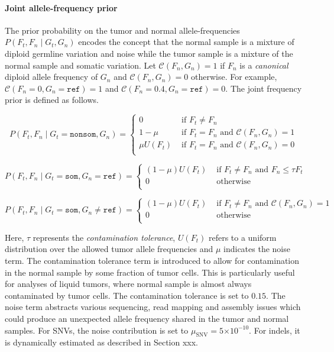 \documentclass{article}
\newcommand{\e}[1]{\ensuremath{\times 10^{#1}}}
\begin{document}
\paragraph{Joint allele-frequency prior}
The prior probability on the tumor and normal allele-frequencies $P(F_t, F_n \mid G_t, G_n)$ encodes the concept that the normal sample is a mixture of diploid germline variation and noise while the tumor sample is a mixture of the normal sample and somatic variation. Let $\mathcal{C} (F_n, G_n) = 1$ if $F_n$ is a {\em canonical} diploid allele frequency of $G_n$ and $\mathcal{C} (F_n, G_n) = 0$ otherwise. For example, $\mathcal{C} (F_n=0, G_n = \texttt{ref}) = 1$ and $\mathcal{C} (F_n=0.4, G_n = \texttt{ref}) = 0$. The joint frequency prior is defined as follows.

\begin{equation*}
P(F_t, F_n \mid G_t = \texttt{nonsom}, G_n)=
\begin{cases}
	0 & \text{ if } F_t \neq F_n \\
	1-\mu & \text{ if } F_t = F_n \text{ and }\mathcal{C}(F_n, G_n) = 1 \\
	\mu U(F_t) & \text{ if } F_t = F_n \text{ and }\mathcal{C}(F_n, G_n) = 0 \\
\end{cases}
\end{equation*}

\begin{equation*}
P(F_t, F_n \mid G_t = \texttt{som}, G_n = \texttt{ref})=
\begin{cases}
	(1-\mu)U(F_t) & \text{ if } F_t \neq F_n \text{ and } F_n \leq \tau F_t \\
	0 & \text{ otherwise } \\
\end{cases}
\end{equation*}

\begin{equation*}
P(F_t, F_n \mid G_t = \texttt{som}, G_n \neq \texttt{ref})=
\begin{cases}
	(1-\mu)U(F_t) & \text{ if } F_t \neq F_n \text{ and } \mathcal{C}(F_n, G_n) = 1 \\
	0 & \text{ otherwise } \\
\end{cases}
\end{equation*}

\noindent Here, $\tau$ represents the {\em contamination tolerance}, $U(F_t)$ refers to a uniform distribution over the allowed tumor allele frequencies and $\mu$ indicates the noise term. The contamination tolerance term is introduced to allow for contamination in the normal sample by some fraction of tumor cells. This is particularly useful for analyses of liquid tumors, where normal sample is almost always contaminated by tumor cells. The contamination tolerance is set to $0.15$. The noise term abstracts various sequencing, read mapping and assembly issues which could produce an unexpected allele frequency shared in the tumor and normal samples. For SNVs, the noise contribution is set to $\mu_{\text{SNV}} = 5\e{-10}$. For indels, it is dynamically estimated as described in Section xxx.
\end{document}
